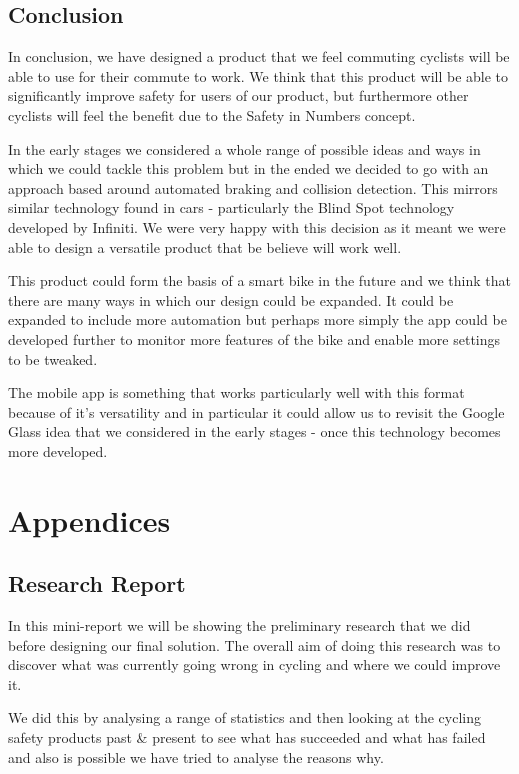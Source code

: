 \documentclass[a4paper]{report}
\begin{document}
{\chapter{Conclusion}
In conclusion, we have designed a product that we feel commuting cyclists will be able to use for their commute to work. We think that this product will be able to significantly improve safety for users of our product, but furthermore other cyclists will feel the benefit due to the Safety in Numbers concept.

In the early stages we considered a whole range of possible ideas and ways in which we could tackle this problem but in the ended we decided to go with an approach based around automated braking and collision detection. This mirrors similar technology found in cars - particularly the Blind Spot technology developed by Infiniti. We were very happy with this decision as it meant we were able to design a versatile product that be believe will work well.

This product could form the basis of a smart bike in the future and we think that there are many ways in which our design could be expanded. It could be expanded to include more automation but perhaps more simply the app could be developed further to monitor more features of the bike and enable more settings to be tweaked. 

The mobile app is something that works particularly well with this format because of it's versatility and in particular it could allow us to revisit the Google Glass idea that we considered in the early stages - once this technology becomes more developed.

\part*{Appendices}

\appendix
\chapter{Research Report}
In this mini-report we will be showing the preliminary research that we did before designing our final solution. The overall aim of doing this research was to discover what was currently going wrong in cycling and where we could improve it. 

We did this by analysing a range of statistics and then looking at the cycling safety products past \& present to see what has succeeded and what has failed and also is possible we have tried to analyse the reasons why. 
\newpage
}
\end{document}
